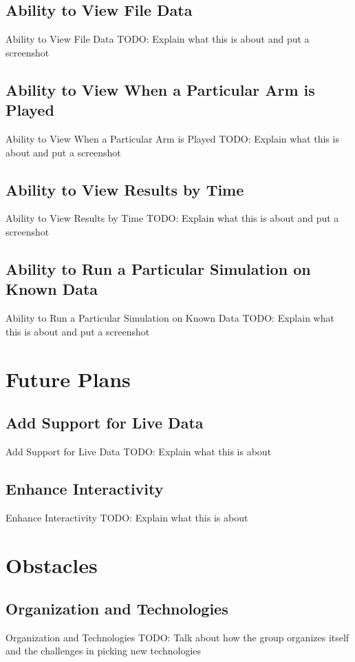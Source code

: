 \documentclass{beamer}
\begin{document}
\subsection{Ability to View File Data}
\begin{frame}{Ability to View File Data}
TODO: Explain what this is about and put a screenshot
\end{frame}

\subsection{Ability to View When a Particular Arm is Played}
\begin{frame}{Ability to View When a Particular Arm is Played}
TODO: Explain what this is about and put a screenshot
\end{frame}

\subsection{Ability to View Results by Time}
\begin{frame}{Ability to View Results by Time}
TODO: Explain what this is about and put a screenshot
\end{frame}

\subsection{Ability to Run a Particular Simulation on Known Data}
\begin{frame}{Ability to Run a Particular Simulation on Known Data}
TODO: Explain what this is about and put a screenshot
\end{frame}

\section{Future Plans}

\subsection{Add Support for Live Data}
\begin{frame}{Add Support for Live Data}
TODO: Explain what this is about
\end{frame}

\subsection{Enhance Interactivity}
\begin{frame}{Enhance Interactivity}
TODO: Explain what this is about
\end{frame}

\section{Obstacles}

\subsection{Organization and Technologies}
\begin{frame}{Organization and Technologies}
TODO: Talk about how the group organizes itself and the challenges in picking new technologies
\end{frame}
\end{document}
